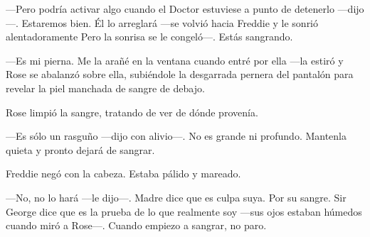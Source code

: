 {---Pero podría activar algo cuando el Doctor estuviese a punto de
	detenerlo ---dijo---. Estaremos bien. Él lo arreglará ---se volvió
	hacia Freddie y le sonrió alentadoramente Pero la sonrisa se le
congeló---. Estás sangrando.}

{---Es mi pierna. Me la arañé en la ventana cuando entré por ella
	---la estiró y Rose se abalanzó sobre ella, subiéndole la desgarrada
pernera del pantalón para revelar la piel manchada de sangre de debajo.}

{Rose limpió la sangre, tratando de ver de dónde provenía.}

{---Es sólo un rasguño ---dijo con alivio---. No es grande ni
profundo. Mantenla quieta y pronto dejará de sangrar.}

{Freddie negó con la cabeza. Estaba pálido y mareado.}

{---No, no lo hará ---le dijo---. Madre dice que es culpa
	suya. Por su sangre. Sir George dice que es la prueba de lo que
	realmente soy ---sus ojos estaban húmedos cuando miró a
Rose---. Cuando empiezo a sangrar, no paro.}

